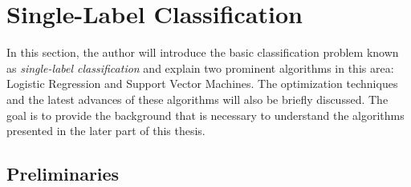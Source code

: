 %
\section{Single-Label Classification}\label{sc_slc}

In this section, the author will introduce the basic classification problem known as \textit{single-label classification} and explain two prominent algorithms in this area: Logistic Regression and Support Vector Machines.
The optimization techniques and the latest advances of these algorithms will also be briefly discussed.
The goal is to provide the background that is necessary to understand the algorithms presented in the later part of this thesis. 



%
%
\subsection{Preliminaries}\label{sc_slc_pn}

